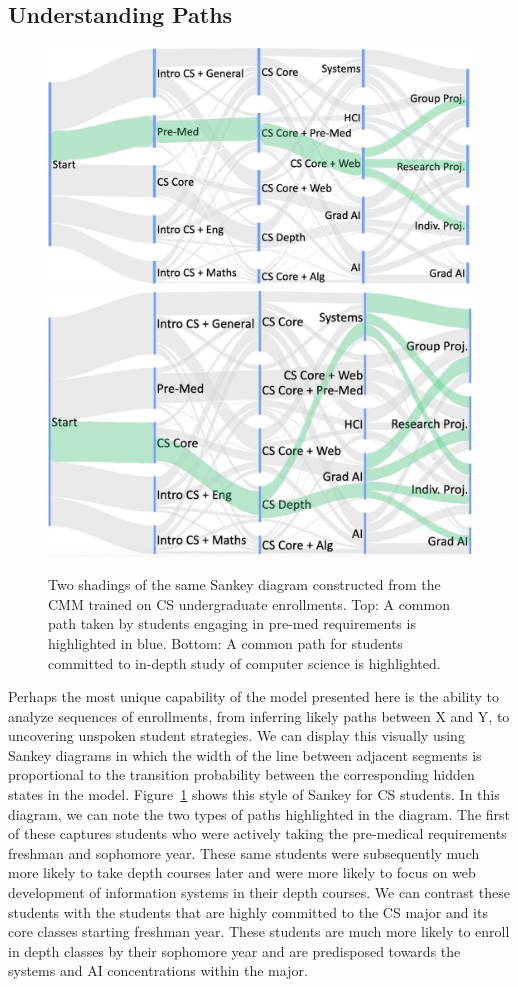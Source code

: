 \documentclass{edm_template}
\begin{document}
\subsection{Understanding Paths}
\label{section:understanding-paths}
   
\begin{figure}[h!]
    \centering
    \includegraphics[width=0.45\linewidth]{figures/premed_highlight.jpg} 
    \qquad
    \includegraphics[width=0.41\linewidth]{figures/systems_highlight.jpg}
    \caption{\label{fig:cs_sankeys} Two shadings of the same Sankey diagram constructed from the CMM trained on CS undergraduate enrollments. Top: A common path taken by students engaging in pre-med requirements is highlighted in blue. Bottom: A common path for students committed to in-depth study of computer science is highlighted.}
\end{figure}

Perhaps the most unique capability of the model presented here is the ability to analyze sequences of enrollments, from inferring likely paths between X and Y, to uncovering unspoken student strategies. We can display this visually using Sankey diagrams in which the width of the line between adjacent segments is proportional to the transition probability between the corresponding hidden states in the model. Figure~\ref{fig:cs_sankeys} shows this style of Sankey for CS students. In this diagram, we can note the two types of paths highlighted in the diagram. The first of these captures students who were actively taking the pre-medical requirements freshman and sophomore year. These same students were subsequently much more likely to take depth courses later and were more likely to focus on web development of information systems in their depth courses. We can contrast these students with the students that are highly committed to the CS major and its core classes starting freshman year. These students are much more likely to enroll in depth classes by their sophomore year and are predisposed towards the systems and AI concentrations within the major.
   
\end{document}
